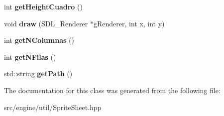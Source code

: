 \begin{DoxyCompactItemize}
\item 
int {\bfseries get\+Height\+Cuadro} ()\hypertarget{class_sprite_sheet_a43a1e4b351be633c70a9515960b26678}{}\label{class_sprite_sheet_a43a1e4b351be633c70a9515960b26678}

\item 
void {\bfseries draw} (S\+D\+L\+\_\+\+Renderer $\ast$g\+Renderer, int x, int y)\hypertarget{class_sprite_sheet_a357c432d49aeabd7dfc0e6b15d01f6bc}{}\label{class_sprite_sheet_a357c432d49aeabd7dfc0e6b15d01f6bc}

\item 
int {\bfseries get\+N\+Columnas} ()\hypertarget{class_sprite_sheet_ad9b9dd4c03f17a4b91e0cb278ae22f50}{}\label{class_sprite_sheet_ad9b9dd4c03f17a4b91e0cb278ae22f50}

\item 
int {\bfseries get\+N\+Filas} ()\hypertarget{class_sprite_sheet_a7f77cb0f67115161ae98cf666a8ebe8f}{}\label{class_sprite_sheet_a7f77cb0f67115161ae98cf666a8ebe8f}

\item 
std\+::string {\bfseries get\+Path} ()\hypertarget{class_sprite_sheet_a92d06776006ea68775db2a0b58a4c62b}{}\label{class_sprite_sheet_a92d06776006ea68775db2a0b58a4c62b}

\end{DoxyCompactItemize}


The documentation for this class was generated from the following file\+:\begin{DoxyCompactItemize}
\item 
src/engine/util/Sprite\+Sheet.\+hpp\end{DoxyCompactItemize}
